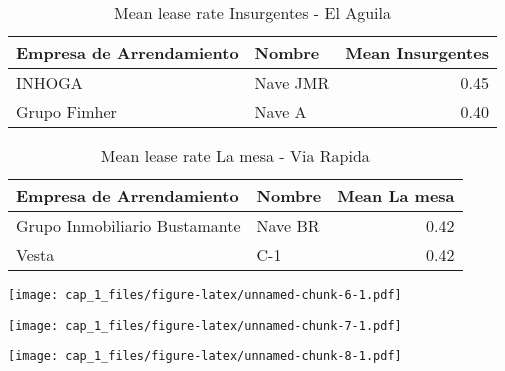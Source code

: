 \documentclass[]{article}
\begin{document}
\begin{table}[ht]
\centering
\caption{Mean lease rate Insurgentes - El Aguila} 
\begingroup\fontsize{7pt}{10pt}\selectfont
\begin{tabular}{llr}
  \hline
Empresa de Arrendamiento & Nombre & Mean Insurgentes \\ 
  \hline
INHOGA & Nave JMR & 0.45 \\ 
  Grupo Fimher & Nave A & 0.40 \\ 
   \hline
\end{tabular}
\endgroup
\end{table}

\begin{table}[ht]
\centering
\caption{Mean lease rate La mesa - Via Rapida} 
\begingroup\fontsize{7pt}{10pt}\selectfont
\begin{tabular}{llr}
  \hline
Empresa de Arrendamiento & Nombre & Mean La mesa \\ 
  \hline
Grupo Inmobiliario Bustamante & Nave BR & 0.42 \\ 
  Vesta & C-1 & 0.42 \\ 
   \hline
\end{tabular}
\endgroup
\end{table}

\texttt{[image: cap\_1\_files/figure-latex/unnamed-chunk-6-1.pdf]}

\texttt{[image: cap\_1\_files/figure-latex/unnamed-chunk-7-1.pdf]}

\texttt{[image: cap\_1\_files/figure-latex/unnamed-chunk-8-1.pdf]}
\end{document}
